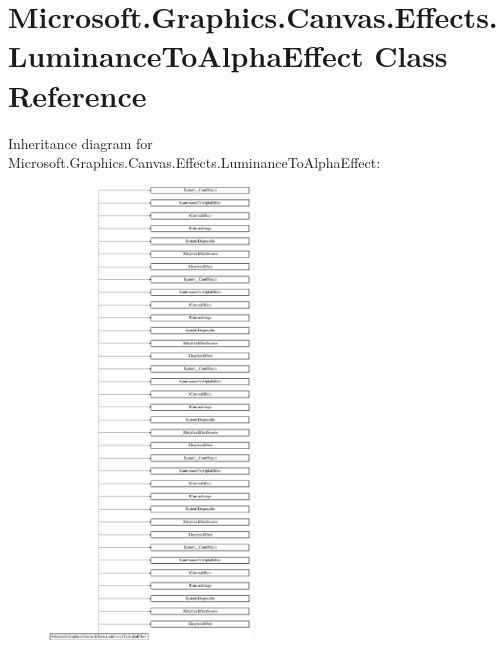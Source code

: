 \hypertarget{class_microsoft_1_1_graphics_1_1_canvas_1_1_effects_1_1_luminance_to_alpha_effect}{}\section{Microsoft.\+Graphics.\+Canvas.\+Effects.\+Luminance\+To\+Alpha\+Effect Class Reference}
\label{class_microsoft_1_1_graphics_1_1_canvas_1_1_effects_1_1_luminance_to_alpha_effect}
Inheritance diagram for Microsoft.\+Graphics.\+Canvas.\+Effects.\+Luminance\+To\+Alpha\+Effect\+:\begin{figure}[H]
\begin{center}
\leavevmode
\includegraphics[height=12.000000cm]{class_microsoft_1_1_graphics_1_1_canvas_1_1_effects_1_1_luminance_to_alpha_effect}
\end{center}
\end{figure}
